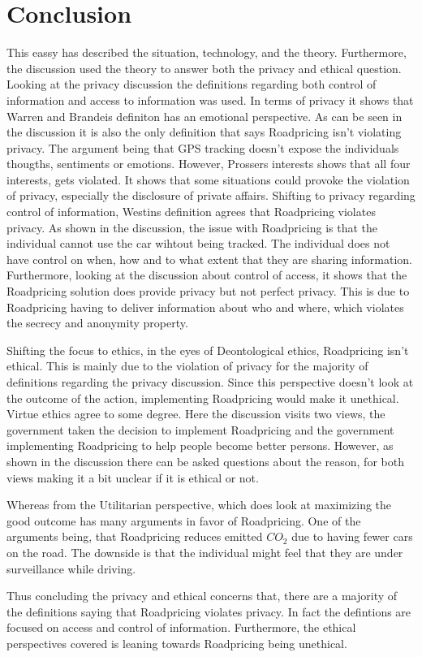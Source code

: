 \section{Conclusion}
This eassy has described the situation, technology, and the theory. Furthermore, the discussion used the theory to answer both the privacy and ethical question. Looking at the privacy discussion the definitions regarding both control of information and access to information was used. In terms of privacy it shows that Warren and Brandeis definiton has an emotional perspective. As can be seen in the discussion it is also the only definition that says Roadpricing isn't violating privacy. 
The argument being that GPS tracking doesn't expose the individuals thougths, sentiments or emotions. However, Prossers interests shows that all four interests, gets violated. It shows that some situations could provoke the violation of privacy, especially the disclosure of private affairs. Shifting to privacy regarding control of information, Westins definition agrees that Roadpricing violates privacy. As shown in the discussion, the issue with Roadpricing is that the individual cannot use the car wihtout being tracked. The individual does not have control on when, how and to what extent that they are sharing information. Furthermore, looking at the discussion about control of access, it shows that the Roadpricing solution does provide privacy but not perfect privacy. This is due to Roadpricing having to deliver information about who and where, which violates the secrecy and anonymity property. 

Shifting the focus to ethics, in the eyes of Deontological ethics, Roadpricing isn't ethical. This is mainly due to the violation of privacy for the majority of  definitions regarding the privacy discussion. Since this perspective doesn't look at the outcome of the action, implementing Roadpricing would make it unethical. Virtue ethics agree to some degree. Here the discussion visits two views, the government taken the decision to implement Roadpricing and the government implementing Roadpricing to help people become better persons. However, as shown in the discussion there can be asked questions about the reason, for both views making it a bit unclear if it is ethical or not.

Whereas from the Utilitarian perspective, which does look at maximizing the good outcome has many arguments in favor of Roadpricing. One of the arguments being, that Roadpricing reduces emitted $CO_2$ due to having fewer cars on the road. The downside is that the individual might feel that they are under surveillance while driving. 

Thus concluding the privacy and ethical concerns that, there are a majority of the definitions saying that Roadpricing violates privacy. In fact the defintions are focused on access and control of information. Furthermore, the ethical perspectives covered is leaning towards Roadpricing being unethical.